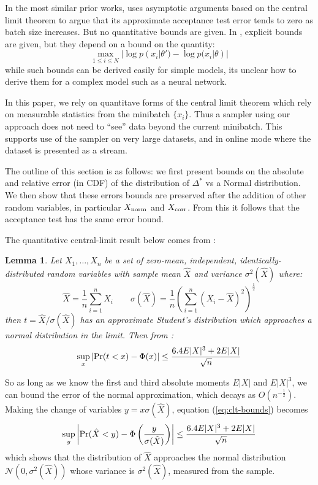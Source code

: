 \documentclass{article}
\newtheorem{lemma}{Lemma}
\begin{document}
In the most similar prior works, \cite{cutting_mh_2014} uses asymptotic arguments based
on the central limit theorem to argue that its approximate acceptance test error tends to
zero as batch size increases. But no quantitative bounds are given. In
\cite{icml2014c1_bardenet14}, explicit bounds are given, but they depend on a bound on
the quantity:
\begin{equation}
  \max_{1\leq i\leq N}|\log p(x_i|\theta') - \log p(x_i|\theta)|
\end{equation}
while such bounds can be derived easily for simple models, its unclear how to derive them
for a complex model such as a neural network.

In this paper, we rely on quantitave forms of the central limit theorem which rely on measurable
statistics from the minibatch $\{x_i\}$. Thus a sampler using our approach does not need to ``see''
data beyond the current minibatch. This supports use of the sampler on very large datasets, and
in online mode where the dataset is presented as a stream.

The outline of this section is as follows: we first present bounds on the absolute
and relative error (in CDF) of the distribution of $\Delta^*$ vs a Normal distribution. We then show that
these errors bounds are preserved after the addition of other random variables, in particular
$X_{\rm norm}$ and $X_{\rm corr}$. From this it follows that the acceptance test has the same error bound.

The quantitative central-limit result below comes from \cite{explicit-clt05}:
  

\begin{lemma}\label{lem:quant_clt}
Let $X_1,\ldots,X_n$ be
a set of zero-mean, independent, identically-distributed random variables with sample mean $\hat{X}$ and
variance $\sigma^2(\hat{X})$ where:
\begin{equation}
  \hat{X} = \frac{1}{n}\sum_{i=1}^nX_i \qquad   \sigma(\hat{X}) = \frac{1}{n}\left(\sum_{i=1}^n(X_i-\hat{X})^2\right)^{\frac{1}{2}}
\end{equation}
then $t=\hat{X}/\sigma(\hat{X})$ has an approximate Student's distribution which approaches a normal
distribution in the limit. Then from \cite{explicit-clt05}:
\begin{equation}\label{eq:clt-bounds}
 \sup_x|{\rm Pr}(t<x) - \Phi(x)| \leq \frac{6.4E|X|^3+2E|X|}{\sqrt{n}}
  \end{equation}
\end{lemma}

So as long as we know the first and third absolute moments $E|X|$ and $E|X|^3$, we can bound the
error of the normal approximation, which decays as $O(n^{-\frac{1}{2}})$. Making the change of variables
$y = x \sigma(\hat{X})$, equation (\ref{eq:clt-bounds}) becomes
\begin{equation}\label{eq:clt-bounds2}
   \sup_y\left|{\rm Pr}(\hat{X}< y) - \Phi\left(\frac{y}{\sigma(\hat{X})}\right)\right| \leq \frac{6.4E|X|^3+2E|X|}{\sqrt{n}}
\end{equation}
which shows that the distribution of $\hat{X}$ approaches the normal distribution $\mathcal{N}(0,\sigma^2(\hat{X}))$
whose variance is $\sigma^2(\hat{X})$, measured from the sample.
\end{document}
